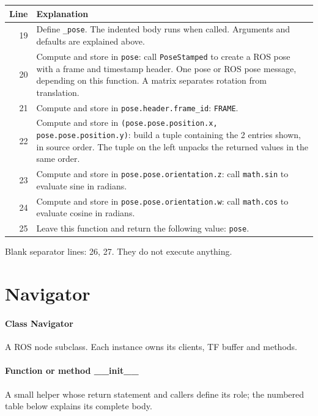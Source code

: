 \documentclass[11pt,a4paper]{book}
\begin{document}
\begin{longtable}{r p{}}

\textbf{Line} & \textbf{Explanation} \\ \hline \endhead

19 & Define \texttt{\_pose}. The indented body runs when called. Arguments and defaults are explained above. \\

20 & Compute and store in \texttt{pose}: call \texttt{PoseStamped} to create a ROS pose with a frame and timestamp header. One pose or ROS pose message, depending on this function. A matrix separates rotation from translation. \\

21 & Compute and store in \texttt{pose.header.frame\_id}: \texttt{FRAME}.  \\

22 & Compute and store in \texttt{(pose.pose.position.x, pose.pose.position.y)}: build a tuple containing the 2 entries shown, in source order. The tuple on the left unpacks the returned values in the same order. \\

23 & Compute and store in \texttt{pose.pose.orientation.z}: call \texttt{math.sin} to evaluate sine in radians.  \\

24 & Compute and store in \texttt{pose.pose.orientation.w}: call \texttt{math.cos} to evaluate cosine in radians.  \\

25 & Leave this function and return the following value: \texttt{pose}. \\

\end{longtable}

Blank separator lines: 26, 27. They do not execute anything.

\section{Navigator}

\paragraph{Class Navigator}
A ROS node subclass. Each instance owns its clients, TF buffer and methods.


\paragraph{Function or method \_\_init\_\_}
A small helper whose return statement and callers define its role; the numbered table below explains its complete body.
\end{document}
